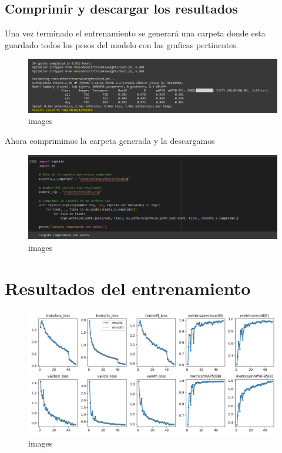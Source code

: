 \documentclass[11pt]{article}
\begin{document}
    \subsection{Comprimir y descargar los
resultados}\label{comprimir-y-descargar-los-resultados}

    Una vez terminado el entrenamiento se generará una carpeta donde esta
guardado todos los pesos del modelo con las graficas pertinentes.

    \begin{figure}
\centering
\includegraphics{imgs/Resultados.png}
\caption{images}
\end{figure}

    Ahora comprimimos la carpeta generada y la descargamos

    \begin{figure}
\centering
\includegraphics{imgs/Comprimimos los resultados para descargar.png}
\caption{images}
\end{figure}

    \section{Resultados del
entrenamiento}\label{resultados-del-entrenamiento}

    \begin{figure}
\centering
\includegraphics{results/results.png}
\caption{images}
\end{figure}
\end{document}

